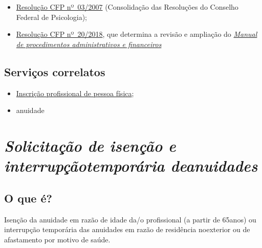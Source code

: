 \begin{itemize}
  \item  \href{https://atosoficiais.com.br/cfp/resolucao-administrativa-financeira-n-3-2007-institui-a-consolidacao-das-resolucoes-do-conselho-federal-de-psicologia?origin=instituicao&q=resolu\%C3\%A7\%C3\%A3o\%203/2007}{Resolução  CFP nº~03/2007} (Consolidação das Resoluções do Conselho Federal de  Psicologia);
  \item  \href{https://transparencia.cfp.org.br/wp-content/uploads/sites/7/2020/05/Manual-de-Procedimentos-Administrativos-e-Financeiro-CFP-RES-20.2018.pdf}{\href{https://atosoficiais.com.br/cfp/resolucao-administrativa-financeira-n-20-2018-altera-o-manual-de-procedimentos-administrativo-e-financeiro-do-sistema-conselhos-de-psicologia-anexo-da-resolucao-cfp-n-202018-a-resolucao-cfp-n-03-2007-a-resolucao-cfp-n-16-2019-e-da-outras-providencias}{Resolução  CFP nº~20/2018}}, que determina a revisão e ampliação do  \href{https://transparencia.cfp.org.br/wp-content/uploads/sites/7/2020/05/Manual-de-Procedimentos-Administrativos-e-Financeiro-CFP-RES-20.2018.pdf}{\emph{Manual  de procedimentos administrativos e financeiros}}
\end{itemize}

\section{Serviços correlatos}

\begin{itemize}
  \item  \hyperref[]{Inscrição  profissional de pessoa física};
  \item  anuidade\end{itemize}

\chapter{\texorpdfstring{\emph{Solicitação de isenção e interrupçãotemporária deanuidades}}{Solicitação de isenção e interrupção temporária de anuidades}}

\section{O que é?}

Isenção da anuidade em razão de idade da/o profissional (a partir de 65anos) ou interrupção temporária das anuidades em razão de residência noexterior ou de afastamento por motivo de saúde.

